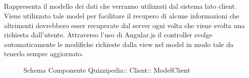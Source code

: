 \subsection{}
Rappresenta il modello dei dati che verranno utilizzati dal sistema lato client. Viene utilizzato tale model per facilitare il recupero di alcune informazioni che altrimenti dovrebbero esser recuperate dal server ogni volta che viene svolta una richiesta dall'utente.
Attraverso l'uso di Angular.js il controller svolge automaticamente le modifiche richieste dalla view nel model in modo tale da tenerlo sempre aggiornato.
\begin{figure}[H]
\centering
\noindent{}
\caption[Schema Componente Quizzipedia::Client::ModelClient]{Schema Componente Quizzipedia:: Client:: ModelClient}
\end{figure}
